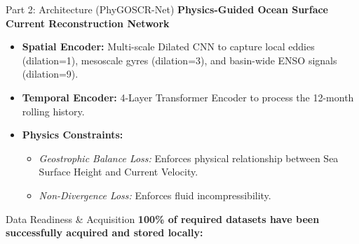 \documentclass[aspectratio=169, xcolor=table]{beamer}
\begin{document}
\begin{frame}{Part 2: Architecture (PhyGOSCR-Net)}
    \textbf{Physics-Guided Ocean Surface Current Reconstruction Network}
    \vspace{0.2cm}
    \begin{itemize}
        \item \textbf{Spatial Encoder:} Multi-scale Dilated CNN to capture local eddies (dilation=1), mesoscale gyres (dilation=3), and basin-wide ENSO signals (dilation=9).
        \item \textbf{Temporal Encoder:} 4-Layer Transformer Encoder to process the 12-month rolling history.
        \item \textbf{Physics Constraints:} 
        \begin{itemize}
            \item \textit{Geostrophic Balance Loss:} Enforces physical relationship between Sea Surface Height and Current Velocity.
            \item \textit{Non-Divergence Loss:} Enforces fluid incompressibility.
        \end{itemize}
    \end{itemize}
\end{frame}

\begin{frame}{Data Readiness \& Acquisition}
    \textbf{100\% of required datasets have been successfully acquired and stored locally:}
    \vspace{0.3cm}
    \begin{table}[]
        \centering
    \end{table}
\end{frame}
\end{document}
